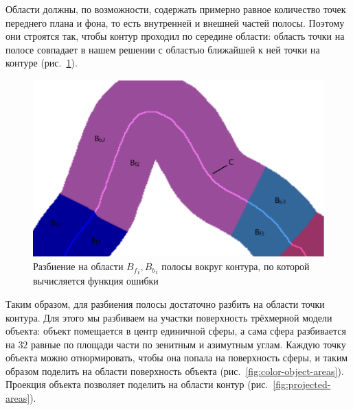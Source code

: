 Области должны, по возможности, содержать примерно равное количество точек
переднего плана и фона, то есть внутренней и внешней частей полосы.
Поэтому они строятся так, чтобы контур проходил по середине
области: область точки на полосе совпадает в нашем решении с областью ближайшей
к ней
точки на контуре (рис.~\ref{fig:fb_contour}).

\begin{figure}[t]
\centering
\includegraphics[width=\textwidth]{fig/fb_contour.png}
\caption{
Разбиение на области ${B_f}_i, {B_b}_i$ полосы вокруг контура, по которой
вычисляется функция ошибки
} \label{fig:fb_contour}
\end{figure}

Таким образом, для разбиения полосы достаточно разбить на области точки контура.
Для этого мы разбиваем на участки поверхность трёхмерной модели
объекта: объект помещается в центр единичной сферы, а сама сфера разбивается
на $32$ равные по площади части по зенитным и азимутным углам.
Каждую точку объекта можно отнормировать, чтобы она попала на поверхность
сферы, и таким образом поделить на области поверхность объекта
(рис.~\ref{fig:color-object-areas}).
Проекция объекта позволяет поделить на области контур
(рис.~\ref{fig:projected-areas}).

